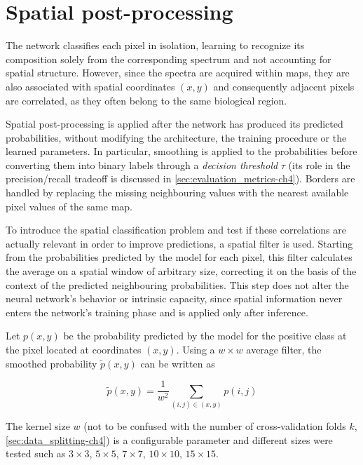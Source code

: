 \section{Spatial post-processing}
\label{sec:spatial_post_processing-ch4}

The network classifies each pixel in isolation, learning to recognize its composition solely from the corresponding spectrum and not accounting for spatial structure. However, since the spectra are acquired within maps, they are also associated with spatial coordinates \((x,y)\) and consequently adjacent pixels are correlated, as they often belong to the same biological region.


Spatial post-processing is applied after the network has produced its predicted probabilities, without modifying the architecture, the training procedure or the learned parameters. In particular, smoothing is applied to the probabilities before converting them into binary labels through a \textit{decision threshold} $\tau$ (its role in the precision/recall tradeoff is discussed in \cref{sec:evaluation_metrics-ch4}). Borders are handled by replacing the missing neighbouring values with the nearest available pixel values of the same map.

To introduce the spatial classification problem and test if these correlations are actually relevant in order to improve predictions, a spatial filter is used. Starting from the probabilities predicted by the model for each pixel, this filter calculates the average on a spatial window of arbitrary size, correcting it on the basis of the context of the predicted neighbouring probabilities.
This step does not alter the neural network's behavior or intrinsic capacity, since spatial information never enters the network's training phase and is applied only after inference.

Let \(p(x,y)\) be the probability predicted by the model for the positive class at the pixel located at coordinates \((x,y)\). Using a \(w \times w\) average filter, the smoothed probability \(\tilde{p}(x,y)\) can be written as

\begin{equation}
    \tilde{p}(x,y) =
    \frac{1}{w^2}
    \sum_{(i,j)\in(x,y)} p(i,j)
    \label{eq:spatial_smoothing-ch4}
\end{equation}

The kernel size $w$ (not to be confused with the number of cross-validation folds $k$, \cref{sec:data_splitting-ch4}) is a configurable parameter and different sizes were tested such as \(3 \times 3\), \(5 \times 5\), \(7 \times 7\), \(10 \times 10\), \(15 \times 15\).

